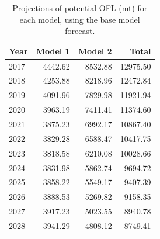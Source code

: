 \documentclass[12pt,]{article}
\begin{document}
\begin{table}[ht]
\centering
\caption{Projections of potential OFL (mt) for each model, using the base model forecast.} 
\label{tab:OFL_projection}
\begin{tabular}{lrrr}
  \hline
Year & Model 1 & Model 2 & Total \\ 
  \hline
2017 & 4442.62 & 8532.88 & 12975.50 \\ 
  2018 & 4253.88 & 8218.96 & 12472.84 \\ 
  2019 & 4091.96 & 7829.98 & 11921.94 \\ 
  2020 & 3963.19 & 7411.41 & 11374.60 \\ 
  2021 & 3875.23 & 6992.17 & 10867.40 \\ 
  2022 & 3829.28 & 6588.47 & 10417.75 \\ 
  2023 & 3818.58 & 6210.08 & 10028.66 \\ 
  2024 & 3831.98 & 5862.74 & 9694.72 \\ 
  2025 & 3858.22 & 5549.17 & 9407.39 \\ 
  2026 & 3888.53 & 5269.82 & 9158.35 \\ 
  2027 & 3917.23 & 5023.55 & 8940.78 \\ 
  2028 & 3941.29 & 4808.12 & 8749.41 \\ 
   \hline
\end{tabular}
\end{table}\begin{table}[ht]
\centering
\caption{Summary of 10-year 
                                             projections beginning in 2018 
                                             for alternate states of nature based on 
                                             an axis of uncertainty for the Northern model.  Columns range over low, mid, and high
                                             states of nature, and rows range over different 
                                             assumptions of catch levels. An entry of "--" 
                                             indicates that the stock is driven to very low 
                                             abundance under the particular scenario.} 
\label{tab:Decision_table_mod1}
\end{table}
\end{document}
